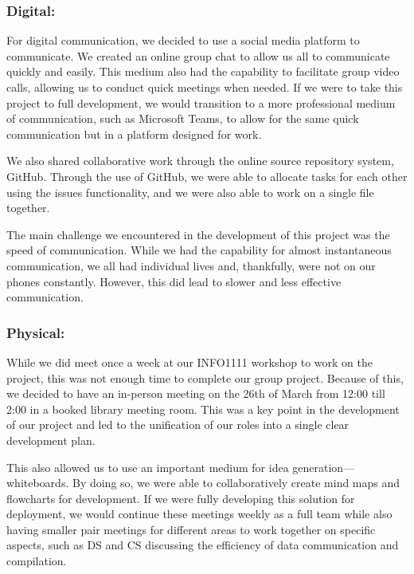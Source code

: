 \documentclass[a4paper, 11pt]{report}
\begin{document}
\subsubsection{Digital:}

For digital communication, we decided to use a social media platform to communicate. We created an online group chat to allow us all to communicate quickly and easily. This medium also had the capability to facilitate group video calls, allowing us to conduct quick meetings when needed. If we were to take this project to full development, we would transition to a more professional medium of communication, such as Microsoft Teams, to allow for the same quick communication but in a platform designed for work.

We also shared collaborative work through the online source repository system, GitHub. Through the use of GitHub, we were able to allocate tasks for each other using the issues functionality, and we were also able to work on a single file together.

The main challenge we encountered in the development of this project was the speed of communication. While we had the capability for almost instantaneous communication, we all had individual lives and, thankfully, were not on our phones constantly. However, this did lead to slower and less effective communication.

\subsubsection{Physical:}

While we did meet once a week at our INFO1111 workshop to work on the project, this was not enough time to complete our group project. Because of this, we decided to have an in-person meeting on the 26th of March from 12:00 till 2:00 in a booked library meeting room. This was a key point in the development of our project and led to the unification of our roles into a single clear development plan.

This also allowed us to use an important medium for idea generation—whiteboards. By doing so, we were able to collaboratively create mind maps and flowcharts for development. If we were fully developing this solution for deployment, we would continue these meetings weekly as a full team while also having smaller pair meetings for different areas to work together on specific aspects, such as DS and CS discussing the efficiency of data communication and compilation.
\end{document}
